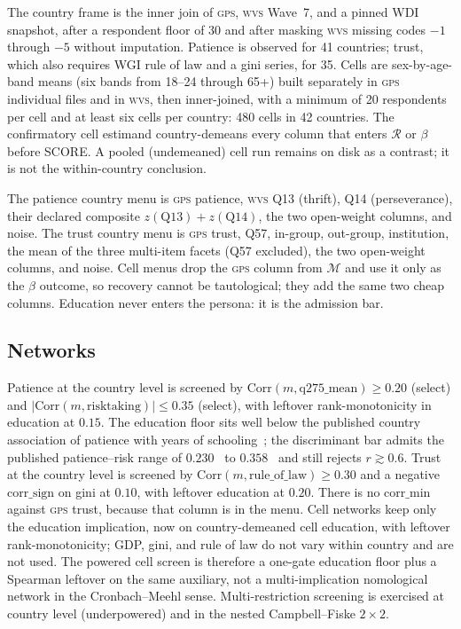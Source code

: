 \documentclass[10pt,letterpaper]{article}
\newcommand{\GPS}{\textsc{gps}}
\newcommand{\WVS}{\textsc{wvs}}
\newcommand{\M}{\ensuremath{\mathcal{M}}}
\newcommand{\Rset}{\mathcal{R}}
\begin{document}
The country frame is the inner join of \GPS{}, \WVS{} Wave~7, and a pinned WDI snapshot, after a respondent floor of 30 and after masking \WVS{} missing codes $-1$ through $-5$ without imputation.
Patience is observed for 41 countries; trust, which also requires WGI rule of law and a gini series, for 35.
Cells are sex-by-age-band means (six bands from 18--24 through 65+) built separately in \GPS{} individual files and in \WVS{}, then inner-joined, with a minimum of 20 respondents per cell and at least six cells per country: 480 cells in 42 countries.
The confirmatory cell estimand country-demeans every column that enters $\Rset$ or $\beta$ before SCORE.
A pooled (undemeaned) cell run remains on disk as a contrast; it is not the within-country conclusion.

The patience country menu is \GPS{} patience, \WVS{} Q13 (thrift), Q14 (perseverance), their declared composite $z(\mathrm{Q13})+z(\mathrm{Q14})$, the two open-weight columns, and noise.
The trust country menu is \GPS{} trust, Q57, in-group, out-group, institution, the mean of the three multi-item facets (Q57 excluded), the two open-weight columns, and noise.
Cell menus drop the \GPS{} column from $\M$ and use it only as the $\beta$ outcome, so recovery cannot be tautological; they add the same two cheap columns.
Education never enters the persona: it is the admission bar.

\subsection{Networks}
\label{sec:app-network}

Patience at the country level is screened by $\mathrm{Corr}(m,\mathrm{q275\_mean})\ge 0.20$ (select) and $|\mathrm{Corr}(m,\mathrm{risktaking})|\le 0.35$ (select), with leftover rank-monotonicity in education at $0.15$.
The education floor sits well below the published country association of patience with years of schooling~\cite{falk2018}; the discriminant bar admits the published patience--risk range of $0.230$~\cite{falk2018} to $0.358$~\cite{hanushek2022} and still rejects $r\gtrsim 0.6$.
Trust at the country level is screened by $\mathrm{Corr}(m,\mathrm{rule\_of\_law})\ge 0.30$ and a negative $\mathrm{corr\_sign}$ on gini at $0.10$, with leftover education at $0.20$.
There is no $\mathrm{corr\_min}$ against \GPS{} trust, because that column is in the menu.
Cell networks keep only the education implication, now on country-demeaned cell education, with leftover rank-monotonicity; GDP, gini, and rule of law do not vary within country and are not used.
The powered cell screen is therefore a one-gate education floor plus a Spearman leftover on the same auxiliary, not a multi-implication nomological network in the Cronbach--Meehl sense.
Multi-restriction screening is exercised at country level (underpowered) and in the nested Campbell--Fiske $2\times 2$.
\end{document}
